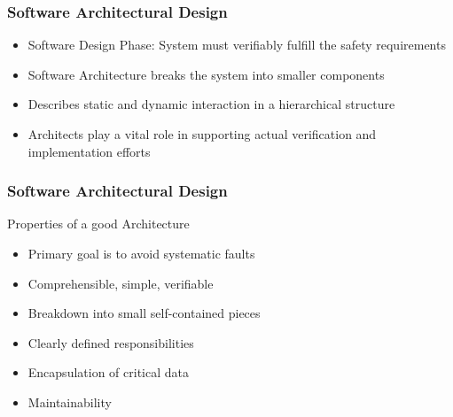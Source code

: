 \documentclass[aspectratio=169]{beamer}
\newif\iftransitions
\newcommand{\cpause}{\iftransitions \pause \fi}
\begin{document}
\begin{frame}
  \frametitle{Software Architectural Design}
  
  \begin{itemize}
  \item Software Design Phase: System must verifiably fulfill the safety requirements \cpause
  \item Software Architecture breaks the system into smaller components \cpause
  \item Describes static and dynamic interaction in a hierarchical structure \cpause
  \item Architects play a vital role in supporting actual verification and implementation efforts
  \end{itemize}
  
\end{frame}




\begin{frame}
  \frametitle{Software Architectural Design}
  
  Properties of a good Architecture \cpause
  \begin{itemize}
  \item Primary goal is to avoid systematic faults \cpause
  \item Comprehensible, simple, verifiable \cpause
  \item Breakdown into small self-contained pieces \cpause
  \item Clearly defined responsibilities \cpause
  \item Encapsulation of critical data \cpause
  \item Maintainability
  \end{itemize}
  
\end{frame}
\end{document}
